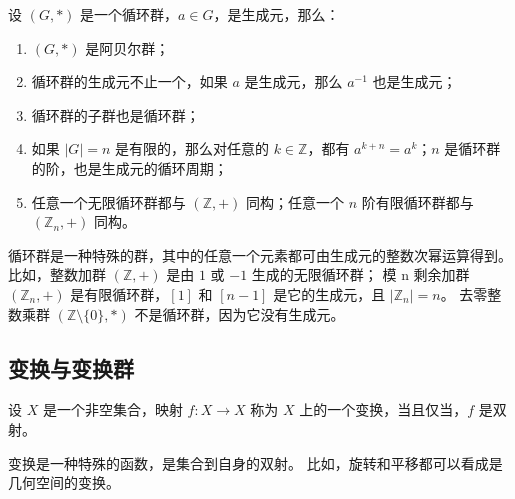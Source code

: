 \begin{proposition}[循环群的性质]
    设 $(G, *)$ 是一个循环群，$a\in G$，是生成元，那么：
    \begin{enumerate}
        \item $(G, *)$ 是阿贝尔群；
        \item 循环群的生成元不止一个，如果 $a$ 是生成元，那么 $a^{-1}$ 也是生成元；
        \item 循环群的子群也是循环群；
        \item 如果 $|G| = n$ 是有限的，那么对任意的 $k\in\mathbb{Z}$，都有 $a^{k+n} = a^k$；$n$ 是循环群的阶，也是生成元的循环周期；
        \item 任意一个无限循环群都与 $(\mathbb{Z}, +)$ 同构；任意一个 $n$ 阶有限循环群都与 $(\mathbb{Z}_n, +)$ 同构。
    \end{enumerate}
\end{proposition}

\begin{note}
    循环群是一种特殊的群，其中的任意一个元素都可由生成元的整数次幂运算得到。比如，整数加群 $(\mathbb{Z}, +)$ 是由 $1$ 或 $-1$ 生成的无限循环群；
    模 n 剩余加群 $(\mathbb{Z}_n,+)$ 是有限循环群，$[1]$ 和 $[n-1]$ 是它的生成元，且 $|\mathbb{Z}_n| = n$。
    去零整数乘群 $(\mathbb{Z}\setminus\{0\}, *)$ 不是循环群，因为它没有生成元。
\end{note}
\vspace{1em}

\subsection{变换与变换群}
\begin{definition}[变换 Transformation]
    设 $X$ 是一个非空集合，映射 $f: X \to X$ 称为 $X$ 上的一个变换，当且仅当，$f$ 是双射。
\end{definition}
\begin{note}
    变换是一种特殊的函数，是集合到自身的双射。
    比如，旋转和平移都可以看成是几何空间的变换。
\end{note}
\vspace{1em}

